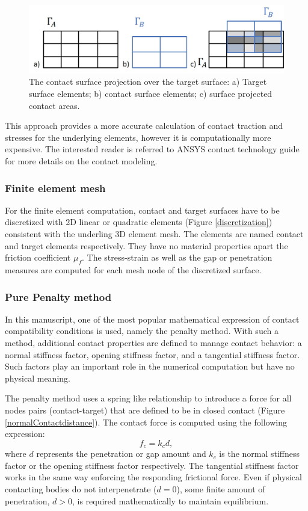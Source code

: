 \begin{figure}[!h]
\centering
\includegraphics[width=1\textwidth,keepaspectratio]{figures/projecte_surface.jpg} 
\caption{The contact surface projection over the target surface: a) Target surface elements; b) contact surface elements; c) surface projected contact areas.}
\label{fig:projecte_surface}
\end{figure}

This approach provides a more accurate calculation of contact traction and stresses for the underlying elements, however it is computationally more expensive. The interested reader is referred to ANSYS contact technology guide \citep{ansys_contact_2017} for more details on the contact modeling.


\subsubsection*{Finite element mesh}
For the finite element computation, contact and target surfaces have to be discretized with 2D linear or quadratic elements (Figure \ref{discretization}) consistent with the underling 3D element mesh. The elements are named contact and target elements respectively.  They have no material properties apart the friction coefficient $\mu_f$. The stress-strain as well as the gap or penetration measures are computed for each mesh node of the discretized surface.

\subsubsection*{Pure Penalty method}
In this manuscript, one of the most popular mathematical expression of contact compatibility conditions is used, namely the penalty method. With such a method, additional contact properties are defined to manage contact behavior: a normal stiffness factor, opening stiffness factor, and a tangential stiffness factor. Such factors play an important role in the numerical computation but have no physical meaning.

The penalty method uses a spring like relationship to introduce a force for all nodes pairs (contact-target) that are defined to be in closed contact (Figure \ref{normalContactdistance}). The contact force is computed using the following expression:
\begin{equation}
f_c = k_c d,
\end{equation}
where $d$ represents the penetration or gap amount and $k_c$ is the normal stiffness factor or the opening stiffness factor respectively. The tangential stiffness factor works in the same way enforcing the responding frictional force. Even if physical contacting bodies do not interpenetrate ($d = 0$), some finite amount of penetration, $d > 0$, is required mathematically to maintain equilibrium. 
 
